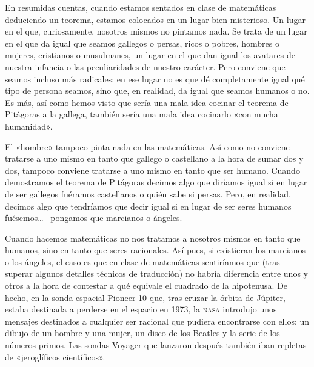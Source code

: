 \documentclass[draft,9pt,letterpaper,twocolumn,openany]{extbook}
\newcommand{\notar}[1]{\marginnote{\small\sffamily #1}[-.8em]}
\begin{document}

En resumidas cuentas, cuando estamos sentados en clase
de matemáticas deduciendo un teorema, estamos
colocados en un lugar bien misterioso. Un lugar en el que,
curiosamente, nosotros mismos no pintamos nada. Se trata
de un lugar en el que da igual que seamos gallegos o persas,
ricos o pobres, hombres o mujeres, cristianos o musulmanes,
un lugar en el que dan igual los avatares de nuestra infancia
o las peculiaridades de nuestro carácter. Pero conviene que
seamos incluso más radicales: en ese lugar no es que dé
completamente igual qué tipo de persona seamos, sino que,
en realidad, da igual que seamos humanos o no. Es más, así
como hemos visto que sería una mala idea cocinar el
teorema de Pitágoras a la gallega, también sería una mala
idea cocinarlo «con mucha humanidad». 

El «hombre» tampoco
pinta nada en las matemáticas. Así como no conviene
tratarse a uno mismo en tanto que gallego o castellano a la
hora de sumar dos y dos, tampoco conviene tratarse a uno
mismo en tanto que ser humano. Cuando demostramos el
teorema de Pitágoras decimos algo que diríamos igual si en
lugar de ser gallegos fuéramos castellanos o quién sabe si
persas. Pero, en realidad, decimos algo que tendríamos que
decir igual si en lugar de ser seres humanos fuésemos\ldots~
pongamos que marcianos o ángeles. 

Cuando hacemos
matemáticas no nos tratamos a nosotros mismos en tanto
que humanos, sino en tanto que seres racionales. Así pues,
si existieran los marcianos o los ángeles, el caso es que en
clase de matemáticas sentiríamos que (tras superar algunos
detalles técnicos de traducción) no habría diferencia entre
unos y otros a la hora de contestar a qué equivale el
cuadrado de la hipotenusa. 
De hecho, en la sonda espacial
Pioneer-10 que, tras cruzar la órbita de Júpiter, estaba
destinada a perderse en el espacio en 1973, la \textsc{nasa}
introdujo unos mensajes destinados a cualquier ser racional
que pudiera encontrarse con ellos: un dibujo de un hombre y
una mujer, un disco de los Beatles y la serie de los números
primos. Las sondas Voyager que lanzaron después también
iban repletas de «jeroglíficos científicos». 
\end{document}

